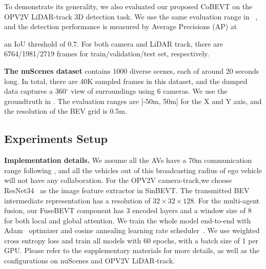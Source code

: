 \documentclass{article}
\begin{document}
To demonstrate its generality, we also evaluated our proposed CoBEVT on the OPV2V LiDAR-track 3D detection task.
%
We use the same evaluation range in ~\cite{xu2021opv2v, chen2022model}, and the detection performance is measured by Average Precisions (AP) at {an IoU threshold of 0.7.
%
For both camera and LiDAR track,  there are 6764/1981/2719 frames for train/validation/test set, respectively.

\noindent\textbf{The nuScenes dataset} contains 1000 diverse scenes, each of around 20 seconds long. 
%
In total, there are 40K sampled frames in this dataset, and the dumped data captures a 360$^{\circ}$ view of surroundings using 6 cameras.
%
We use the groundtruth in \cite{zhou2022cross}.
%
The evaluation ranges are [-50{m}, 50{m}] for the X and Y axis, and the resolution of the BEV grid is 0.5m.

\subsection{Experiments Setup}

\noindent\textbf{Implementation details.} We assume all the AVs have a 70m communication range following \cite{wang2020v2vnet}, and all the vehicles out of this broadcasting radius of ego vehicle will not have any collaboration. For the OPV2V camera-track,we choose ResNet34~\cite{he2016deep} as the image feature extractor in SinBEVT. The transmitted BEV intermediate representation has a resolution of $32\times32\times128$.
%
For the multi-agent fusion, our FuseBEVT component has 3 encoded layers and a window size of 8 for both local and global attention.
%
We train the whole model end-to-end with Adam~\cite{loshchilov2017decoupled} optimizer and cosine annealing learning rate scheduler~\cite{loshchilov2016sgdr}.
%
We use weighted cross entropy loss and train all models with 60 epochs, with a batch size of 1 per GPU. Please refer to the supplementary materials for more details, as well as the configurations on nuScenes and OPV2V LiDAR-track.



}
\end{document}
